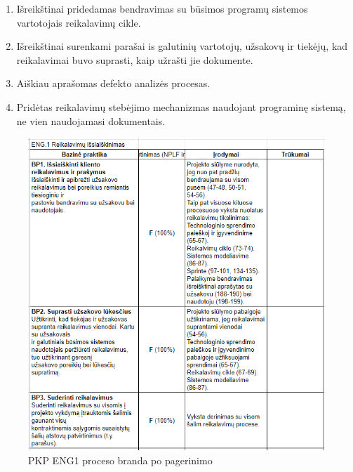 \documentclass{VUMIFPSkursinis}
\begin{document}
	\begin{enumerate}
		\item{Išreikštinai pridedamas bendravimas su būsimos programų sistemos vartotojais reikalavimų cikle.}
		\item{Išreikštinai surenkami parašai is galutinių vartotojų, užsakovų ir tiekėjų, kad reikalavimai buvo suprasti, kaip užrašti jie dokumente.}
		\item{Aiškiau aprašomas defekto analizės procesas.}
		\item{Pridėtas reikalavimų stebėjimo mechanizmas naudojant programinę sistemą, ne vien naudojamasi dokumentais.}
	\end{enumerate}

	\begin{figure}[!htbp]
		\includegraphics[scale=1]{img/eng1one}
		\caption{PKP ENG1  proceso branda po pagerinimo} %
		\label{img:pkpPries}
	\end{figure}
\end{document}
